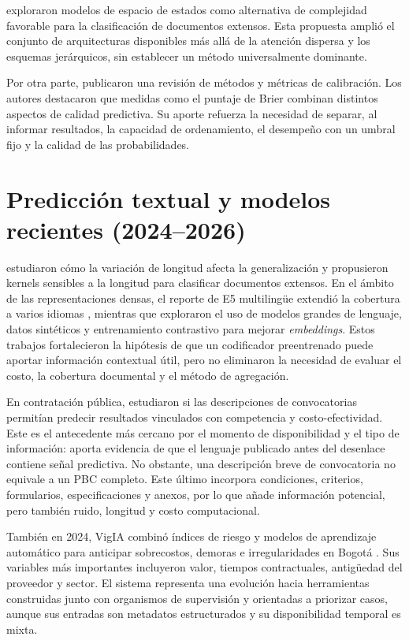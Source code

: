 \textcite{lu2023statespace} exploraron modelos de espacio de estados como alternativa de complejidad favorable para la clasificación de documentos extensos. Esta propuesta amplió el conjunto de arquitecturas disponibles más allá de la atención dispersa y los esquemas jerárquicos, sin establecer un método universalmente dominante.

Por otra parte, \textcite{silvafilho2023calibration} publicaron una revisión de métodos y métricas de calibración. Los autores destacaron que medidas como el puntaje de Brier combinan distintos aspectos de calidad predictiva. Su aporte refuerza la necesidad de separar, al informar resultados, la capacidad de ordenamiento, el desempeño con un umbral fijo y la calidad de las probabilidades.

\section{Predicción textual y modelos recientes (2024--2026)}

\textcite{han2024lengthaware} estudiaron cómo la variación de longitud afecta la generalización y propusieron kernels sensibles a la longitud para clasificar documentos extensos. En el ámbito de las representaciones densas, el reporte de E5 multilingüe extendió la cobertura a varios idiomas \parencite{e5multilingual2024}, mientras que \textcite{wang2024improvingembeddings} exploraron el uso de modelos grandes de lenguaje, datos sintéticos y entrenamiento contrastivo para mejorar \textit{embeddings}. Estos trabajos fortalecieron la hipótesis de que un codificador preentrenado puede aportar información contextual útil, pero no eliminaron la necesidad de evaluar el costo, la cobertura documental y el método de agregación.

En contratación pública, \textcite{acikalin2024procurementcalls} estudiaron si las descripciones de convocatorias permitían predecir resultados vinculados con competencia y costo-efectividad. Este es el antecedente más cercano por el momento de disponibilidad y el tipo de información: aporta evidencia de que el lenguaje publicado antes del desenlace contiene señal predictiva. No obstante, una descripción breve de convocatoria no equivale a un PBC completo. Este último incorpora condiciones, criterios, formularios, especificaciones y anexos, por lo que añade información potencial, pero también ruido, longitud y costo computacional.

También en 2024, VigIA combinó índices de riesgo y modelos de aprendizaje automático para anticipar sobrecostos, demoras e irregularidades en Bogotá \parencite{salazar2024vigia}. Sus variables más importantes incluyeron valor, tiempos contractuales, antigüedad del proveedor y sector. El sistema representa una evolución hacia herramientas construidas junto con organismos de supervisión y orientadas a priorizar casos, aunque sus entradas son metadatos estructurados y su disponibilidad temporal es mixta.


